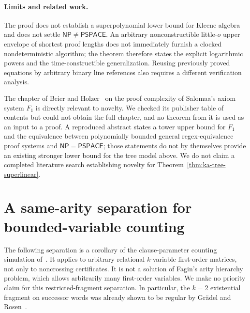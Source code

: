 \documentclass[11pt]{article}
\theoremstyle{definition}
\theoremstyle{remark}
\begin{document}
\paragraph{Limits and related work.}
The proof does not establish a superpolynomial lower bound for
Kleene algebra and does not settle $\mathsf{NP}\ne\mathsf{PSPACE}$.
An arbitrary nonconstructible little-$o$ upper envelope of shortest
proof lengths does not immediately furnish a clocked nondeterministic
algorithm; the theorem therefore states the explicit logarithmic
powers and the time-constructible generalization. Reusing previously
proved equations by arbitrary binary line references also requires
a different verification analysis.

The chapter of Beier and Holzer~\cite{BH24} on the proof complexity
of Salomaa's axiom system $F_1$ is directly relevant to novelty. We
checked its publisher table of contents but could not obtain the full
chapter, and no theorem from it is used as an input to a proof. A
reproduced abstract states a tower upper bound for $F_1$ and the
equivalence between polynomially bounded general regex-equivalence
proof systems and $\mathsf{NP}=\mathsf{PSPACE}$; those statements do
not by themselves provide an existing stronger lower bound for the
tree model above. We do not claim a completed literature search
establishing novelty for Theorem~\ref{thm:ka-tree-superlinear}.


\section{A same-arity separation for bounded-variable counting}
\label{sec:bounded-variable}

The following separation is a corollary of the clause-parameter
counting simulation of~\cite{Cruz26}. It applies to arbitrary
relational $k$-variable first-order matrices, not only to noncrossing
certificates. It is not a solution of Fagin's arity hierarchy
problem, which allows arbitrarily many first-order variables. We make
no priority claim for this restricted-fragment separation. In
particular, the $k=2$ existential fragment on successor words was
already shown to be regular by Gr\"adel and Rosen~\cite{GR99}.
\end{document}
